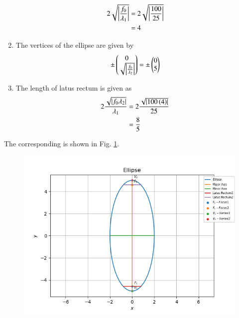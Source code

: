 \begin{enumerate}
\begin{align}
	2\sqrt{\left\vert\frac{f_0}{\lambda_1}\right\vert}&= 2\sqrt{\left\vert\frac{100}{25}\right\vert}\\
	&= 4
\end{align}
\item The vertices of the ellipse are given by
\begin{align}
	\pm \begin{pmatrix}0\\\sqrt{\left\vert\frac{f_0}{\lambda_2}\right\vert}\end{pmatrix}= \pm \begin{pmatrix}0\\5\end{pmatrix}
\end{align}
\item The length of latus rectum is given as
\begin{align}
	2\frac{\sqrt{\left\vert f_0 \lambda_2\right\vert}}{\lambda_1} &= 2\frac{\sqrt{\left\vert100\left(4\right)\right\vert}}{25}\\
	&= \frac{8}{5}
\end{align}
\end{enumerate}
The corresponding is shown in Fig. \ref{fig:chapters/11/11/3/2/Fig1}.
\begin{figure}[!h]
	\begin{center} 
	    \includegraphics[width=\columnwidth]{chapters/11/11/3/2/figs/ellipse}
	\end{center}
\caption{}
\label{fig:chapters/11/11/3/2/Fig1}
\end{figure}
